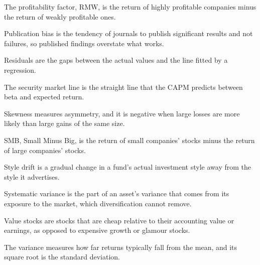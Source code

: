 \begin{keyterms}
\begin{description}[leftmargin=0pt, itemsep=2pt, parsep=0pt, font=\normalfont\bfseries\color{FEMaroon}]
  \item[Profitability factor.] The profitability factor, RMW, is the return of highly profitable companies minus the return of weakly profitable ones.
  \item[Publication bias.] Publication bias is the tendency of journals to publish significant results and not failures, so published findings overstate what works.
  \item[Residuals.] Residuals are the gaps between the actual values and the line fitted by a regression.
  \item[Security market line.] The security market line is the straight line that the CAPM predicts between beta and expected return.
  \item[Skewness.] Skewness measures asymmetry, and it is negative when large losses are more likely than large gains of the same size.
  \item[SMB.] SMB, Small Minus Big, is the return of small companies' stocks minus the return of large companies' stocks.
  \item[Style drift.] Style drift is a gradual change in a fund's actual investment style away from the style it advertises.
  \item[Systematic variance.] Systematic variance is the part of an asset's variance that comes from its exposure to the market, which diversification cannot remove.
  \item[Value stocks.] Value stocks are stocks that are cheap relative to their accounting value or earnings, as opposed to expensive growth or glamour stocks.
  \item[Variance.] The variance measures how far returns typically fall from the mean, and its square root is the standard deviation.
\end{description}
\end{keyterms}
